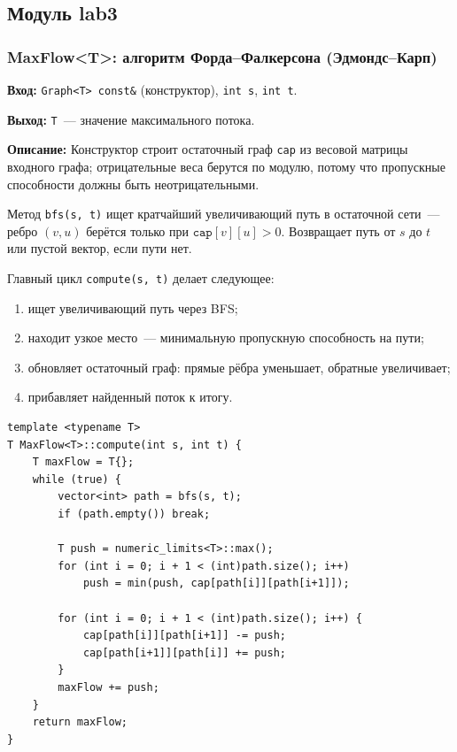 \subsection{Модуль lab3}

\subsubsection{MaxFlow\textless T\textgreater: алгоритм Форда--Фалкерсона (Эдмондс--Карп)}

\textbf{Вход:} \texttt{Graph<T> const\&} (конструктор), \texttt{int s}, \texttt{int t}.

\textbf{Выход:} \texttt{T}~--- значение максимального потока.

\textbf{Описание:} Конструктор строит остаточный граф \texttt{cap}
из весовой матрицы входного графа; отрицательные веса берутся по модулю,
потому что пропускные способности должны быть неотрицательными.

Метод \texttt{bfs(s, t)} ищет кратчайший увеличивающий путь в остаточной
сети~--- ребро $(v, u)$ берётся только при $\texttt{cap}[v][u] > 0$.
Возвращает путь от $s$ до $t$ или пустой вектор, если пути нет.

Главный цикл \texttt{compute(s, t)} делает следующее:
\begin{enumerate}
    \item ищет увеличивающий путь через BFS;
    \item находит узкое место~--- минимальную пропускную способность на пути;
    \item обновляет остаточный граф: прямые рёбра уменьшает, обратные увеличивает;
    \item прибавляет найденный поток к итогу.
\end{enumerate}

\begin{lstlisting}[style=cstyle, caption={Алгоритм Эдмондса--Карпа (maxflow.cpp)}]
template <typename T>
T MaxFlow<T>::compute(int s, int t) {
    T maxFlow = T{};
    while (true) {
        vector<int> path = bfs(s, t);
        if (path.empty()) break;

        T push = numeric_limits<T>::max();
        for (int i = 0; i + 1 < (int)path.size(); i++)
            push = min(push, cap[path[i]][path[i+1]]);

        for (int i = 0; i + 1 < (int)path.size(); i++) {
            cap[path[i]][path[i+1]] -= push;
            cap[path[i+1]][path[i]] += push;
        }
        maxFlow += push;
    }
    return maxFlow;
}
\end{lstlisting}


